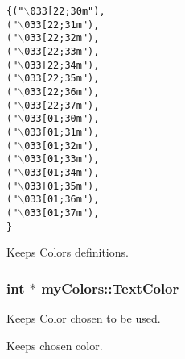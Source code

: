 \begin{footnotesize}\begin{alltt}
 \{ (\textcolor{stringliteral}{"\(\backslash\)033[22;30m"}), 
                                        (\textcolor{stringliteral}{"\(\backslash\)033[22;31m"}), 
                                        (\textcolor{stringliteral}{"\(\backslash\)033[22;32m"}), 
                                        (\textcolor{stringliteral}{"\(\backslash\)033[22;33m"}), 
                                        (\textcolor{stringliteral}{"\(\backslash\)033[22;34m"}), 
                                        (\textcolor{stringliteral}{"\(\backslash\)033[22;35m"}), 
                                        (\textcolor{stringliteral}{"\(\backslash\)033[22;36m"}), 
                                        (\textcolor{stringliteral}{"\(\backslash\)033[22;37m"}), 
                                        (\textcolor{stringliteral}{"\(\backslash\)033[01;30m"}), 
                                        (\textcolor{stringliteral}{"\(\backslash\)033[01;31m"}), 
                                        (\textcolor{stringliteral}{"\(\backslash\)033[01;32m"}),
                                        (\textcolor{stringliteral}{"\(\backslash\)033[01;33m"}),
                                        (\textcolor{stringliteral}{"\(\backslash\)033[01;34m"}),
                                        (\textcolor{stringliteral}{"\(\backslash\)033[01;35m"}),
                                        (\textcolor{stringliteral}{"\(\backslash\)033[01;36m"}),
                                        (\textcolor{stringliteral}{"\(\backslash\)033[01;37m"}),
    \}
\end{alltt}\end{footnotesize}


Keeps Colors definitions. 

\hypertarget{namespacemyColors_a52b646aad549675b463b1b37c6be6145}{
\subsubsection[{TextColor}]{\setlength{\rightskip}{0pt plus 5cm}int $\ast$ {\bf myColors::TextColor}}}
\label{namespacemyColors_a52b646aad549675b463b1b37c6be6145}


Keeps Color chosen to be used. 

Keeps chosen color. 